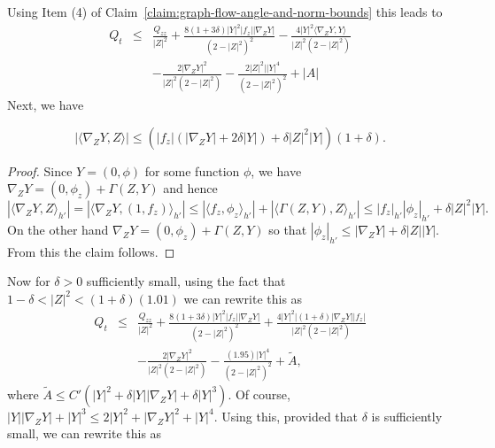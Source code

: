 Using Item (4) of Claim~\ref{claim:graph-flow-angle-and-norm-bounds} this leads to
\begin{eqnarray*}
Q_t & \le & \frac{Q_{zz}}{|Z|^2}+\frac{8(1+3\delta)|Y|^2|f_z|
|\nabla_ZY|}{(2-|Z|^2)^2} -\frac{4|Y|^2\langle
 \nabla_ZY,Y\rangle }{|Z|^2(2-|Z|^2)} \\
 & &
-\frac{2|\nabla_ZY|^2}{|Z|^2(2-|Z|^2)}
 -\frac{2|Z|^2||Y|^4}{(2-|Z|^2)^2}
 +|A|
 \end{eqnarray*}
Next, we have
\begin{claim}
\label{claim:graph-flow-mixed-derivative-bound}
$$|\langle \nabla_ZY,Z\rangle|\le (|f_z|(|\nabla_ZY|+2\delta|Y|)+\delta|Z|^2|Y|)(1+\delta).$$
\end{claim}

\begin{proof}
Since $Y=(0,\phi)$ for some function $\phi$, we have
$\nabla_ZY=(0,\phi_z)+\Gamma(Z,Y)$ and hence
$$|\langle\nabla_ZY,Z\rangle_{h'}| = |\langle \nabla_ZY,(1,f_z)\rangle_{h'}|\le |\langle
f_z ,\phi_z\rangle_{h'}|+|\langle \Gamma(Z,Y),Z\rangle_{h'}|\le
|f_z|_{h'}|\phi_z|_{h'}+\delta|Z|^2|Y|.$$ On the other hand
$\nabla_ZY=(0,\phi_z)+\Gamma(Z,Y)$ so that $|\phi_z|_{h'}\le|\nabla_ZY|+\delta
|Z||Y|$. From this the claim follows.
\end{proof}

Now for $\delta>0$ sufficiently small, using the fact that
$1-\delta<|Z|^2<(1+\delta)(1.01)$ we can rewrite this as
\begin{eqnarray*}
Q_t & \le & \frac{Q_{zz}}{|Z|^2}+\frac{8(1+3\delta)|Y|^2|f_z|
|\nabla_ZY|}{(2-|Z|^2)^2} +\frac{4|Y|^2|(1+\delta)
 |\nabla_ZY||f_z|}{|Z|^2(2-|Z|^2)} \\
 & & -\frac{2|\nabla_ZY|^2}{|Z|^2(2-|Z|^2)}-\frac{(1.95)|Y|^4}{(2-|Z|^2)^2} +\tilde
 A,
 \end{eqnarray*}
where $\tilde A\le C'(|Y|^2+\delta|Y||\nabla_ZY|+\delta|Y|^3)$. Of
course, $|Y||\nabla_ZY|+|Y|^3\le 2|Y|^2+|\nabla_ZY|^2+|Y|^4$. Using
this, provided that $\delta$ is sufficiently small, we can rewrite
this as

